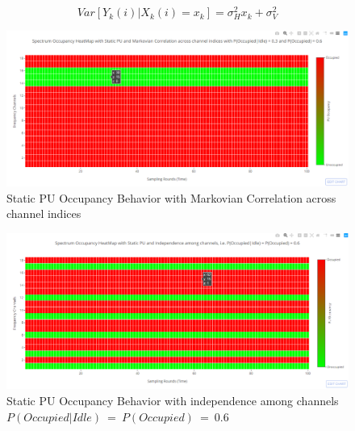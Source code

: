\documentclass[12pt, draftcls, onecolumn]{IEEEtran}
\begin{document}
\begin{equation}\label{6}
    Var[Y_k(i) | X_k(i) = x_k] = \sigma_H^2x_k + \sigma_V^2
\end{equation}
\begin{figure}[t]
\includegraphics[width=1.0\textwidth]{Spectrum_Occupancy_Spatial_Markovian_Correlation.png}
\caption{Static PU Occupancy Behavior with Markovian Correlation across channel indices}
\label{fig:mesh1}
\centering
\end{figure}
\begin{figure}[t]
\includegraphics[width=1.0\textwidth]{Spectrum_Occupancy_Spatial_Independence_2.png}
\caption{Static PU Occupancy Behavior with independence among channels $P(Occupied|Idle)\ =\ P(Occupied)\ =\ 0.6$}
\label{fig:mesh2}
\centering
\end{figure}
\end{document}
